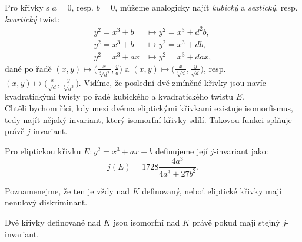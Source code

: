 \documentclass [12pt]{report}
\begin{document}
Pro křivky s $a=0$, resp. $b=0$, můžeme analogicky najít \textit{kubický} a \textit{sextický}, resp. \textit{kvartický} twist:
\begin{align*}
y^2 = x^3 + b &\mapsto y^2 = x^3 + d^2 b ,\\
y^2 = x^3 + b &\mapsto y^2 = x^3 + d b, \\
y^2 = x^3 +ax &\mapsto y^2 = x^3 + d ax ,
\end{align*}
dané po řadě $(x,y)  \mapsto \big(\frac{x}{\sqrt[3]{d^2}}, \frac{y}{d}\big)$ a $(x,y)  \mapsto \big(\frac{x}{\sqrt[3]{d}}, \frac{y}{\sqrt{d}}\big)$, resp. $(x,y)  \mapsto \big(\frac{x}{\sqrt{d}}, \frac{y}{\sqrt[4]{d^3}}\big)$. Vidíme, že poslední dvě zmíněné křivky jsou navíc kvadratickými twisty po řadě kubického a kvadratického twistu $E$.\\


Chtěli bychom říci, kdy mezi dvěma eliptickými křivkami existuje isomorfismus, tedy najít nějaký invariant, který isomorfní křivky sdílí. Takovou funkci splňuje právě $j$-invariant.

\begin{definice}
Pro eliptickou křivku $E: y^2 = x^3 + ax + b$ definujeme její $j$-invariant jako:
\begin{equation*}
j(E) = 1728 \frac{4a^3}{4a^3+27b^2}.
\end{equation*}
\end{definice}
Poznamenejme, že ten je vždy nad $K$ definovaný, neboť eliptické křivky mají nenulový diskriminant.
\begin{veta}
Dvě křivky definované nad $K$ jsou isomorfní nad $\overline{K}$ právě pokud mají stejný $j$-invariant.
\end{veta}
\end{document}
